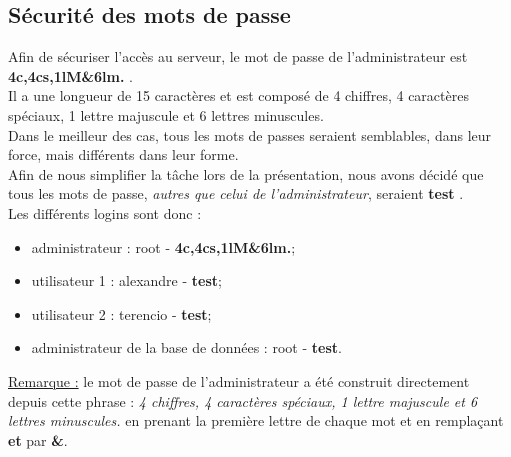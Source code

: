 \newpage
\subsection{Sécurité des mots de passe}
\label{subsec:securite-mdps}

Afin de sécuriser l'accès au serveur, le mot de passe de l'administrateur est
\og \textbf{4c,4cs,1lM\&6lm.} \fg. \\
Il a une longueur de 15 caractères et est composé de 4 chiffres, 4 caractères
spéciaux, 1 lettre majuscule et 6 lettres minuscules. \\

Dans le meilleur des cas, tous les mots de passes seraient semblables, dans leur
force, mais différents dans leur forme. \\
Afin de nous simplifier la tâche lors de la présentation, nous avons décidé que
tous les mots de passe, \emph{autres que celui de l'administrateur}, seraient
\og \textbf{test} \fg. \\

Les différents logins sont donc :
\begin{itemize}

    \item administrateur : root - \textbf{4c,4cs,1lM\&6lm.};
    \item utilisateur 1 : alexandre - \textbf{test};
    \item utilisateur 2 : terencio - \textbf{test};
    \item administrateur de la base de données : root - \textbf{test}.

\end{itemize}

\underline{Remarque :} le mot de passe de l'administrateur a été construit
directement depuis cette phrase : \og \textit{4 chiffres, 4 caractères spéciaux,
1 lettre majuscule et 6 lettres minuscules.} \fg en prenant la première lettre
de chaque mot et en remplaçant \textbf{et} par \textbf{\&}.

